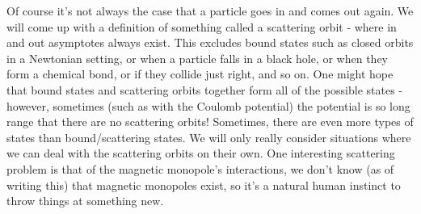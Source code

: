 \documentclass{article}
\begin{document}
Of course it's not always the case that a particle goes in and comes out again. We will come up with a definition of something called a scattering orbit - where in and out asymptotes always exist. This excludes bound states such as closed orbits in a Newtonian setting, or when a particle falls in a black hole, or when they form a chemical bond, or if they collide just right, and so on. One might hope that bound states and scattering orbits together form all of the possible states - however, sometimes (such as with the Coulomb potential) the potential is so long range that there are no scattering orbits! Sometimes, there are even more types of states than bound/scattering states. We will only really consider situations where we can deal with the scattering orbits on their own. One interesting scattering problem is that of the magnetic monopole's interactions, we don't know (as of writing this) that magnetic monopoles exist, so it's a natural human instinct to throw things at something new.
\end{document}
